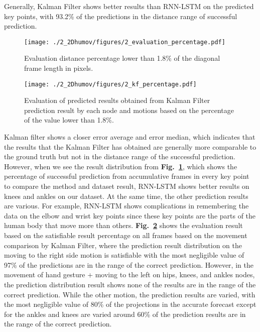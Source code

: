 Generally, Kalman Filter shows better results than RNN-LSTM on the predicted key points, with 93.2\% of the predictions in the distance range of successful prediction.

\begin{figure}
    \centering
    \texttt{[image: ./2\_2Dhumov/figures/2\_evaluation\_percentage.pdf]}
    \caption{Evaluation distance percentage lower than 1.8\% of the diagonal frame length in pixels.}
    \label{fig:2_evaluation_percentage}
\end{figure}

\begin{figure}
    \centering
    \texttt{[image: ./2\_2Dhumov/figures/2\_kf\_percentage.pdf]}
    \caption{Evaluation of predicted results obtained from Kalman Filter prediction result by each node and motions based on the percentage of the value lower than 1.8\%.}
    \label{fig:2_kf_percentage}
\end{figure}

Kalman filter shows a closer error average and error median, which indicates that the results that the Kalman Filter has obtained are generally more comparable to the ground truth but not in the distance range of the successful prediction. However, when we see the result distribution from \textbf{Fig.~\ref{fig:2_evaluation_percentage}}, which shows the percentage of successful prediction from accumulative frames in every key point to compare the method and dataset result, RNN-LSTM shows better results on knees and ankles on our dataset. At the same time, the other prediction results are various. For example, RNN-LSTM shows complications in remembering the data on the elbow and wrist key points since these key points are the parts of the human body that move more than others. \textbf{Fig.~\ref{fig:2_kf_percentage}} shows the evaluation result based on the satisfiable result percentage on all frames based on the movement comparison by Kalman Filter, where the prediction result distribution on the moving to the right side motion is satisfiable with the most negligible value of 97\% of the predictions are in the range of the correct prediction. However, in the movement of hand gesture + moving to the left on hips, knees, and ankles nodes, the prediction distribution result shows none of the results are in the range of the correct prediction. While the other motion, the prediction results are varied, with the most negligible value of 80\% of the projections in the accurate forecast except for the ankles and knees are varied around 60\% of the prediction results are in the range of the correct prediction.

